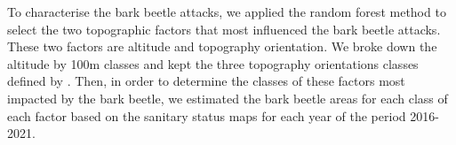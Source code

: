\documentclass[3p,procedia]{elsarticle}
\begin{document}









To characterise the bark beetle attacks, we applied the random forest method to select the two topographic factors that most influenced the bark beetle attacks.
These two factors are altitude and topography orientation. We broke down the altitude by 100m classes and kept the three topography orientations classes defined by \cite{Delvaux_galoux}.
Then, in order to determine the classes of these factors most impacted by the bark beetle, we estimated the bark beetle areas for each class of each factor based on the sanitary status maps for each year of the period 2016-2021.

\end{document}
